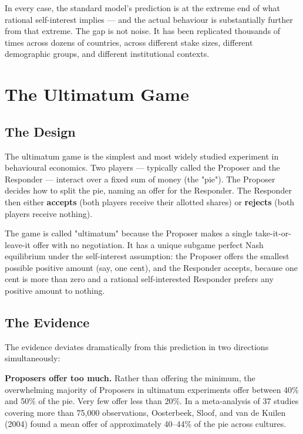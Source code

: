 \documentclass[12pt, letterpaper]{article}
\begin{document}
In every case, the standard model's prediction is at the extreme end of what rational self-interest implies --- and the actual behaviour is substantially further from that extreme. The gap is not noise. It has been replicated thousands of times across dozens of countries, across different stake sizes, different demographic groups, and different institutional contexts.

\medskip


\section{The Ultimatum Game}



\subsection{The Design}


The ultimatum game is the simplest and most widely studied experiment in behavioural economics. Two players --- typically called the Proposer and the Responder --- interact over a fixed sum of money (the "pie"). The Proposer decides how to split the pie, naming an offer for the Responder. The Responder then either \textbf{accepts} (both players receive their allotted shares) or \textbf{rejects} (both players receive nothing).

The game is called "ultimatum" because the Proposer makes a single take-it-or-leave-it offer with no negotiation. It has a unique subgame perfect Nash equilibrium under the self-interest assumption: the Proposer offers the smallest possible positive amount (say, one cent), and the Responder accepts, because one cent is more than zero and a rational self-interested Responder prefers any positive amount to nothing.

\newpage
\subsection{The Evidence}


The evidence deviates dramatically from this prediction in two directions simultaneously:

\textbf{Proposers offer too much.} Rather than offering the minimum, the overwhelming majority of Proposers in ultimatum experiments offer between 40\% and 50\% of the pie. Very few offer less than 20\%. In a meta-analysis of 37 studies covering more than 75,000 observations, Oosterbeek, Sloof, and van de Kuilen (2004) found a mean offer of approximately 40--44\% of the pie across cultures.
\end{document}
